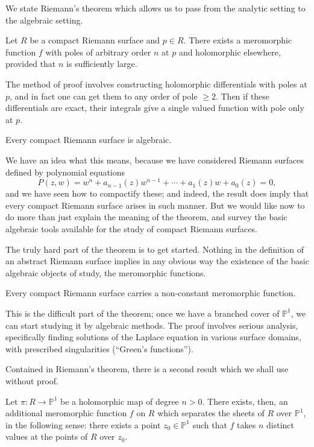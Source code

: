 \documentclass[12pt]{article}
\begin{document}
We state Riemann's theorem which allows us to pass from the analytic setting to the algebraic setting.
\begin{theorem}
    Let $R$ be a compact Riemann surface and $p\in R$. There exists a meromorphic function $f$ with poles of arbitrary order $n$ at $p$ and holomorphic elsewhere, provided that $n$ is sufficiently large.
\end{theorem}

The method of proof involves constructing holomorphic differentials with poles at $p$, and in fact one can get them to any order of pole $\geq 2$. Then if these differentials are exact, their integrals give a single valued function with pole only at $p$.

\begin{theorem}
Every compact Riemann surface is algebraic.
\end{theorem}

We have an idea what this means, because we have considered Riemann surfaces defined by polynomial equations
\[
P(z,w) = w^n + a_{n-1}(z)w^{n-1} + \cdots + a_1(z)w + a_0(z) = 0,
\]
and we have seen how to compactify these; and indeed, the result does imply that every compact Riemann surface arises in such manner.  
But we would like now to do more than just explain the meaning of the theorem, and survey the basic algebraic tools available for the study of compact Riemann surfaces.

The truly hard part of the theorem is to get started.  Nothing in the definition of an abstract Riemann surface implies in any obvious way the existence of the basic algebraic objects of study, the meromorphic functions.

\begin{theorem}
Every compact Riemann surface carries a non-constant meromorphic function.
\end{theorem}

\begin{remark}
    This is the difficult part of the theorem; once we have a branched cover of $\mathbb{P}^1$, we can start studying it by algebraic methods.  
The proof involves serious analysis, specifically finding solutions of the Laplace equation in various surface domains, with prescribed singularities (“Green's functions”).
\end{remark}

Contained in Riemann's theorem, there is a second result which we shall use without proof.

\begin{proposition}
Let $\pi : R \to \mathbb{P}^1$ be a holomorphic map of degree $n > 0$.  
There exists, then, an additional meromorphic function $f$ on $R$ which separates the sheets of $R$ over $\mathbb{P}^1$, in the following sense: there exists a point $z_0 \in \mathbb{P}^1$ such that $f$ takes $n$ distinct values at the points of $R$ over $z_0$.
\end{proposition}
\end{document}
